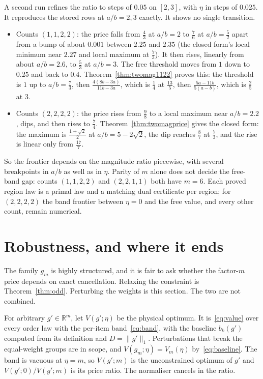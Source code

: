 A second run refines the ratio to steps of $0.05$ on $[2,3]$, with $\eta$ in steps of
$0.025$. It reproduces the stored rows at $a/b=2,3$ exactly. It shows no single transition.
\NUM{}
\begin{itemize}
\item Counts $(1,1,2,2)$: the price falls from $\frac43$ at $a/b=2$ to $\frac76$ at $a/b=\frac52$
apart from a bump of about $0.001$ between $2.25$ and $2.35$ (the closed form's local minimum near
$2.27$ and local maximum at $\frac73$). It then rises,
linearly from about $a/b=2.6$, to $\frac53$ at $a/b=3$. The free threshold moves
from $1$ down to $0.25$ and back to $0.4$. Theorem~\ref{thm:twomag1122} proves this: the threshold
is $1$ up to $a/b=\frac73$, then $\frac{4(8b-3a)}{11b-3a}$, which is $\frac14$ at $\frac{13}5$, then
$\frac{5a-11b}{5(a-b)}$, which is $\frac25$ at $3$.
\item Counts $(2,2,2,2)$: the price rises from $\frac98$ to a local maximum near $a/b=2.2$,
dips, and then rises to $\frac74$. Theorem~\ref{thm:twomagprice} gives the closed form: the maximum
is $\frac{1+\sqrt2}2$ at $a/b=5-2\sqrt2$, the dip reaches $\frac87$ at $\frac73$, and the rise is
linear only from $\frac{17}7$.
\end{itemize}
So the frontier depends on the magnitude ratio piecewise, with several breakpoints in $a/b$ as
well as in $\eta$. Parity of $m$ alone does not decide the free-band gap: counts $(1,1,2,2)$ and
$(2,2,1,1)$ both have $m=6$. Each proved region law is a primal law and a matching dual
certificate per region; for $(2,2,2,2)$ the band frontier between $\eta=0$ and the free value,
and every other count, remain numerical.

\section{Robustness, and where it ends}
\label{sec:robust}

The family $g_{m}$ is highly structured, and it is fair to ask whether the factor-$m$ price
depends on exact cancellation. Relaxing the constraint is Theorem~\ref{thm:odd}. Perturbing
the weights is this section. The two are not combined.

For arbitrary $g'\in\mathbb{R}^{m}$, let $V(g';\eta)$ be the physical optimum. It
is~\eqref{eq:value} over every order law with the per-item band~\eqref{eq:band}, with the
baseline $b_{k}(g')$ computed from its definition and $D=\|g'\|_{1}$. Perturbations that break
the equal-weight groups are in scope, and $V(g_{m};\eta)=V_{m}(\eta)$
by~\eqref{eq:baseline}. The band is vacuous at $\eta=m$, so $V(g';m)$ is the unconstrained
optimum of $g'$ and $V(g';0)/V(g';m)$ is its price ratio. The normaliser cancels in the
ratio.

